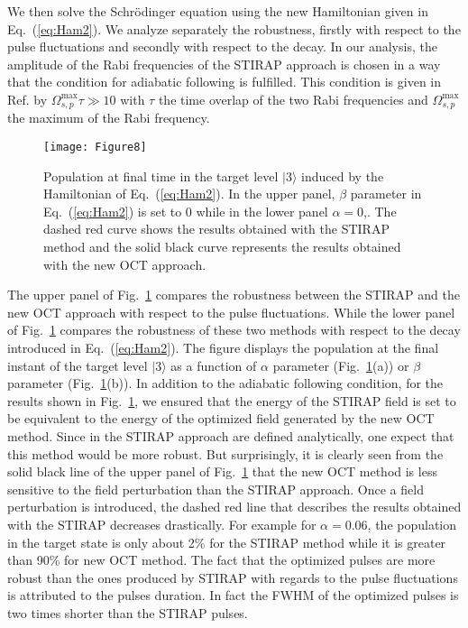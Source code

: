 \documentclass[]{interact}
\theoremstyle{plain}%
\theoremstyle{definition}
\theoremstyle{remark}
\begin{document}
We then solve the Schr\"odinger equation using the new Hamiltonian given in 
Eq.~(\ref{eq:Ham2}). We analyze separately the robustness, firstly with respect 
to the pulse fluctuations and secondly with respect to the decay. 
In our analysis, the amplitude of the Rabi frequencies of the STIRAP approach 
is 
chosen in a way that the condition for adiabatic following
is fulfilled. This condition is given in Ref. \cite{Bergmann} by 
$\Omega_{s,p}^{\mathrm{max}}\tau\gg 10$
with $\tau$ the time overlap of the two Rabi frequencies and
$\Omega_{s,p}^{\mathrm{max}}$ the maximum of the Rabi frequency.  
\begin{figure}[h!]
\centering
\texttt{[image: Figure8]}
\caption{Population at final time in the target level $|3\rangle$ induced 
by the Hamiltonian of Eq.~(\ref{eq:Ham2}). 
In the upper panel, $\beta$ parameter in  Eq.~(\ref{eq:Ham2}) is set to 0 
while in the lower panel $\alpha=0$,.
The dashed red curve shows the results obtained with the STIRAP method and the 
solid black curve represents the results 
obtained with the new OCT approach.}
\label{fig:pop_robustness_energy}
\end{figure}
The upper panel of Fig.~\ref{fig:pop_robustness_energy} compares the robustness
between the STIRAP and the new OCT approach with respect to the pulse 
fluctuations. While the lower panel of  Fig.~\ref{fig:pop_robustness_energy} 
compares the robustness of these two methods with respect 
to the decay introduced in Eq.~(\ref{eq:Ham2}). 
The figure displays the population at the final instant of the 
target level $|3\rangle$  as a function of $\alpha$ parameter 
(Fig.~\ref{fig:pop_robustness_energy}(a)) 
or $\beta$ parameter (Fig.~\ref{fig:pop_robustness_energy}(b)).
In addition to the adiabatic following condition, 
for the results shown in Fig.~\ref{fig:pop_robustness_energy}, we ensured that 
the energy of the STIRAP field is set to be equivalent to the energy of the 
optimized field generated by the new OCT method.  
Since in the STIRAP approach are defined analytically, one expect that 
this method would be more robust. But surprisingly, it is clearly seen from the 
solid black line of the upper panel of 
Fig.~\ref{fig:pop_robustness_energy} that the new OCT method is less 
sensitive to the field perturbation than the STIRAP approach.  
Once a field perturbation is introduced, the dashed red line that describes the 
results obtained with the STIRAP decreases drastically. For example for 
$\alpha=0.06$, the population in the target state is only about 2\% for the 
STIRAP method while it is greater than 90\% for new OCT method. The fact that 
the optimized pulses are more robust than the ones produced by STIRAP with 
regards to the pulse fluctuations is attributed to the pulses duration. In fact 
the FWHM of the optimized pulses is two times shorter than the STIRAP pulses. 
\end{document}
